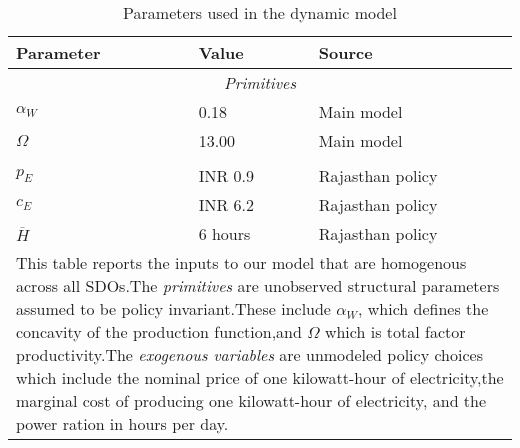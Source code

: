 \begin{table}[!ht]
	\centering
	\caption{Parameters used in the dynamic model \label{tab:dynamicParameters}} 
	\begin{tabular}{p{2 cm}p{2 cm}p{6 cm}}
		\toprule
		 Parameter & Value & Source \\
		\midrule
		\multicolumn{3}{c}{\emph{Primitives}} \\
 		\addlinespace 
		 $\alpha_W$ & 0.18 & Main model \\
		 $\Omega$ & 13.00 & Main model \\
		\addlinespace
 		\multicolumn{3}{c}{\emph{Exogenous variables}} \\
 		\addlinespace 
		 $p_E$ & INR 0.9  & Rajasthan policy \\
		 $c_E$ & INR 6.2  & Rajasthan policy \\
		 $\overline{H}$ & 6 hours & Rajasthan policy \\
		\bottomrule
		\multicolumn{3}{p{0.65\hsize}}{\footnotesize This table reports the inputs to our model that are homogenous across all SDOs.The \emph{primitives} are unobserved structural parameters assumed to be policy invariant.These include $\alpha_W$, which defines the concavity of the production function,and $\Omega$ which is total factor productivity.The \emph{exogenous variables} are unmodeled policy choices which include the nominal price of one kilowatt-hour of electricity,the marginal cost of producing one kilowatt-hour of electricity, and the power ration in hours per day.}
	\end{tabular}
\end{table}